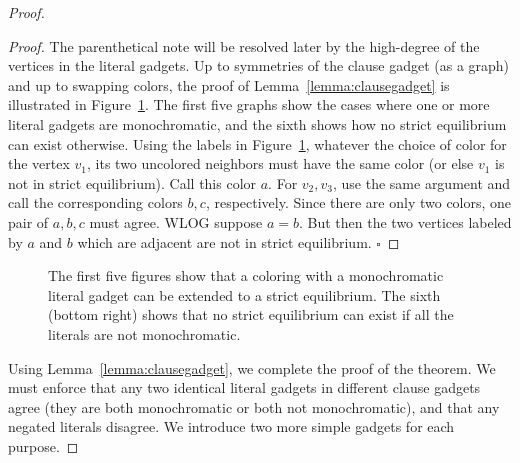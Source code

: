 \documentclass{llncs}
\begin{document}
\begin{proof}
\begin{proof}
The parenthetical note will be resolved later by the high-degree of the
vertices in the literal gadgets. Up to symmetries of the clause gadget (as a
graph) and up to swapping colors, the proof of Lemma~\ref{lemma:clausegadget}
is illustrated in Figure~\ref{fig:clauselemmaproof}. The first five graphs show the
cases where one or more literal gadgets are monochromatic, and the sixth shows
how no strict equilibrium can exist otherwise. Using the labels in Figure~\ref{fig:clauselemmaproof}, whatever
the choice of color for the vertex $v_1$, its two uncolored neighbors must have
the same color (or else $v_1$ is not in strict equilibrium). Call this color $a$. For
$v_2, v_3$, use the same argument and call the corresponding colors $b, c$,
respectively. Since there are only two colors, one pair of $a,b,c$ must agree.
WLOG suppose $a=b$. But then the two vertices labeled by $a$ and $b$ which are
adjacent are not in strict equilibrium.
\hfill $\square$
\end{proof}

\begin{figure}[h]
\centering
{}
\caption{The first five figures show
that a coloring with a monochromatic literal gadget can be extended to a strict
equilibrium. The sixth (bottom right) shows that no strict equilibrium can
exist if all the literals are not monochromatic.}
\label{fig:clauselemmaproof}
\end{figure}

Using Lemma~\ref{lemma:clausegadget}, we complete the proof of the theorem. We
must enforce that any two identical literal gadgets in different clause gadgets
agree (they are both monochromatic or both not monochromatic), and that any
negated literals disagree. We introduce two more simple gadgets for each
purpose.


\end{proof}
\end{document}

